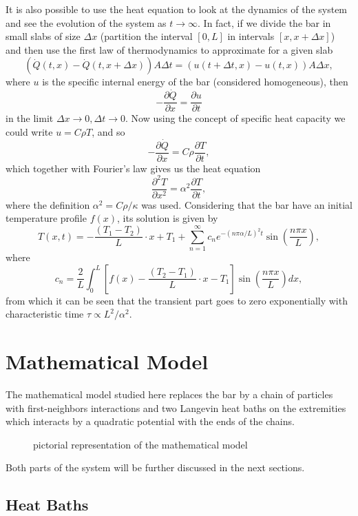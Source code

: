 It is also possible to use the heat equation to look at the dynamics of the system and see the evolution of the system as $ t\to \infty $. In fact, if we divide the bar in small slabs of size $ \Delta x $ (partition the interval $ [0,L] $ in intervals $ [x,x+\Delta x] $) and then use the first law of thermodynamics to approximate for a given slab
\[ 
	(\dot{Q}(t,x) - \dot{Q}(t,x+\Delta x))A\Delta t = 
	(u(t+\Delta t,x) - u(t,x)) A \Delta x,
\]
where $ u $ is the specific internal energy of the bar (considered homogeneous), then
\[ 
	-\frac{\partial \dot{Q}}{\partial x} = 
	\frac{\partial u }{\partial t}
 \]
in the limit $ \Delta x\to 0, \Delta t\to 0$. Now using the concept of specific heat capacity we could write $ u = C\rho T $, and so
\[ 
	-\frac{\partial \dot{Q}}{\partial x} = 
	C \rho \frac{\partial T }{\partial t},
 \]
which together with Fourier's law gives us the heat equation
\[ 
	\frac{\partial^{2} T}{\partial x^{2}} = 
	\alpha^{2} \frac{\partial T }{\partial t},
\]
where the definition $ \alpha^{2} = C \rho / \kappa $ was used. Considering that the bar have an initial temperature profile $ f(x) $, its solution is given by
\[ 
	T(x,t) = - \frac{(T_{1} - T_{2})}{L}\cdot x + T_{1} +
	\sum_{n=1}^{\infty} c_{n} e^{-(n\pi\alpha/L)^{2} t}
	\sin \left( \frac{n\pi x}{L} \right),
\]
where
\[ 
	c_{n} = \frac{2 }{L }\int_{0}^{L} 
	\left[ f(x) - \frac{(T_{2} - T_{1})}{L}\cdot x - T_{1}\right]
	\sin \left(\frac{n\pi x }{L}\right)dx,
 \]
from which it can be seen that the transient part goes to zero exponentially with characteristic time $ \tau \propto L^{2}/\alpha^{2} $.

\section{Mathematical Model}

The mathematical model studied here replaces the bar by a chain of particles with first-neighbors interactions and two Langevin heat baths on the extremities which interacts by a quadratic potential with the ends of the chains.

\begin{figure}[H] 
		\centering 
		\fontsize{18}{14} 
		\label{ch2_3} 
		\caption{pictorial representation of the mathematical model}
\end{figure} 

Both parts of the system will be further discussed in the next sections.

\subsection{Heat Baths}

